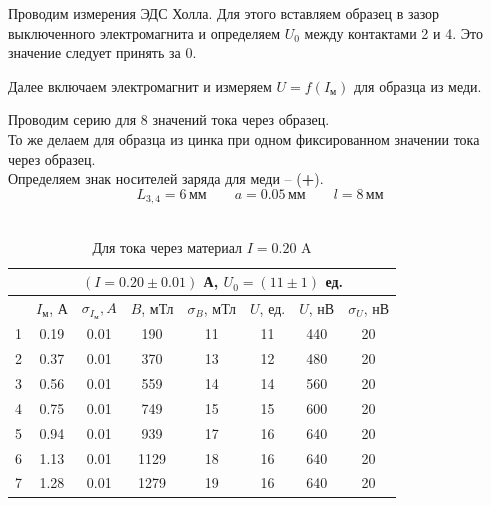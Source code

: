 \documentclass[a4paper,12pt]{article}
\theoremstyle{definition}
\begin{document}
    Проводим измерения ЭДС Холла. Для этого вставляем образец в зазор выключенного электромагнита и определяем $U_0$ между контактами 2 и 4. Это значение следует принять за 0.
    \par Далее включаем электромагнит и измеряем $U = f(I_{\text{м}})$ для образца из меди.

    Проводим серию для 8 значений тока через образец.\\
    То же делаем для образца из цинка при одном фиксированном значении тока через образец.\\
    Определяем знак носителей заряда для меди -- (\textbf{+}). \\
    $$L_{3,4} = 6\,\text{мм} \qquad a = 0.05\,\text{мм} \qquad l = 8\,\text{мм}$$ \\

    \begin{table}[H]
      \centering
      \caption{Для тока через материал $I = 0.20$ A}
      \label{tabular:med1}
        \begin{tabular}{|c|c|c|c|c|c|c|c|} \hline
            & \multicolumn{7}{c|}{$(I = 0.20 \pm 0.01)$ А, \qquad $U_0 = (11 \pm 1)$ ед.} \\ \hline
            & $I_{\text{м}}$, А & $\sigma_{I_{\text{м}}}, A$ & $B$, мТл & $\sigma_B$, мТл & $U$, ед. & $U$, нВ & $\sigma_{U}$, нВ \\ \hline
          1 & 0.19 & 0.01 &  190 & 11 & 11 & 440 & 20 \\ \hline
          2 & 0.37 & 0.01 &  370 & 13 & 12 & 480 & 20 \\ \hline
          3 & 0.56 & 0.01 &  559 & 14 & 14 & 560 & 20 \\ \hline
          4 & 0.75 & 0.01 &  749 & 15 & 15 & 600 & 20 \\ \hline
          5 & 0.94 & 0.01 &  939 & 17 & 16 & 640 & 20 \\ \hline
          6 & 1.13 & 0.01 & 1129 & 18 & 16 & 640 & 20 \\ \hline
          7 & 1.28 & 0.01 & 1279 & 19 & 16 & 640 & 20 \\ \hline
        \end{tabular}\\
    \end{table}
\end{document}
